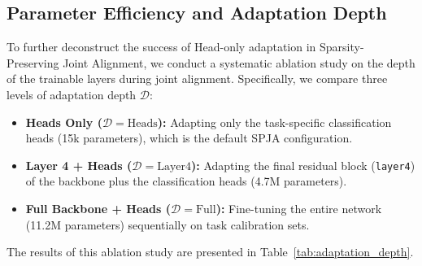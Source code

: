 \documentclass{article}
\theoremstyle{plain}
\theoremstyle{definition}
\theoremstyle{remark}
\begin{document}
\subsection{Parameter Efficiency and Adaptation Depth}
To further deconstruct the success of Head-only adaptation in Sparsity-Preserving Joint Alignment, we conduct a systematic ablation study on the depth of the trainable layers during joint alignment. Specifically, we compare three levels of adaptation depth $\mathcal{D}$:
\begin{itemize}
    \item \textbf{Heads Only ($\mathcal{D}=\text{Heads}$):} Adapting only the task-specific classification heads (15k parameters), which is the default SPJA configuration.
    \item \textbf{Layer 4 + Heads ($\mathcal{D}=\text{Layer4}$):} Adapting the final residual block (\texttt{layer4}) of the backbone plus the classification heads (4.7M parameters).
    \item \textbf{Full Backbone + Heads ($\mathcal{D}=\text{Full}$):} Fine-tuning the entire network (11.2M parameters) sequentially on task calibration sets.
\end{itemize}

The results of this ablation study are presented in Table~\ref{tab:adaptation_depth}.
\end{document}
